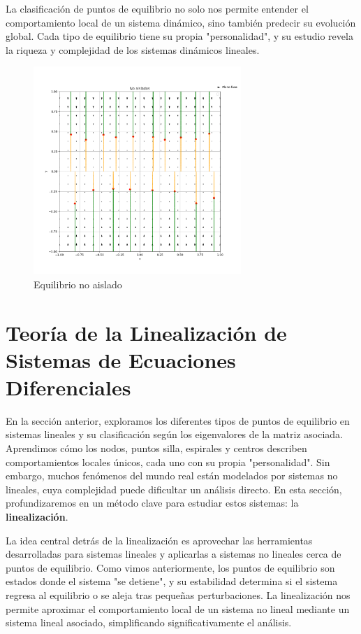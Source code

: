 La clasificación de puntos de equilibrio no solo nos permite entender el comportamiento local de un sistema dinámico, sino también predecir su evolución global. Cada tipo de equilibrio tiene su propia "personalidad", y su estudio revela la riqueza y complejidad de los sistemas dinámicos lineales.

\begin{figure}[h]
    \centering
    \includegraphics[width=0.7\textwidth]{Img/NoAislados.png}
    \caption{Equilibrio no aislado}
    \label{fig:no_aislado}
\end{figure}


\section{Teoría de la Linealización de Sistemas de Ecuaciones Diferenciales}

En la sección anterior, exploramos los diferentes tipos de puntos de equilibrio en sistemas lineales y su clasificación según los eigenvalores de la matriz asociada. Aprendimos cómo los nodos, puntos silla, espirales y centros describen comportamientos locales únicos, cada uno con su propia "personalidad". Sin embargo, muchos fenómenos del mundo real están modelados por sistemas no lineales, cuya complejidad puede dificultar un análisis directo. En esta sección, profundizaremos en un método clave para estudiar estos sistemas: la \textbf{linealización}.

La idea central detrás de la linealización es aprovechar las herramientas desarrolladas para sistemas lineales y aplicarlas a sistemas no lineales cerca de puntos de equilibrio. Como vimos anteriormente, los puntos de equilibrio son estados donde el sistema "se detiene", y su estabilidad determina si el sistema regresa al equilibrio o se aleja tras pequeñas perturbaciones. La linealización nos permite aproximar el comportamiento local de un sistema no lineal mediante un sistema lineal asociado, simplificando significativamente el análisis.

